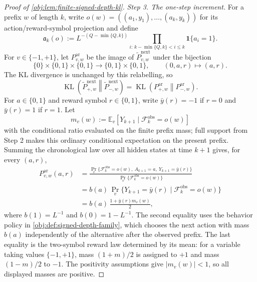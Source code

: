 \documentclass[11pt]{article}
\begin{document}
\begin{proof}[Proof of \cref{obj:lem:finite-signed-depth-kl}]
\emph{Step 3. The one-step increment.}
For a prefix \(w\) of length \(k\), write \(o(w)=((a_1,y_1),\ldots,(a_k,y_k))\) for its action/reward-symbol projection and define
\[
\mathfrak a_k(o)
:=
L^{-(Q-\min\{Q,k\})}
\prod_{i:\,k-\min\{Q,k\}<i\le k}\mathbf 1\{a_i=1\}.
\]
For \(v\in\{-1,+1\}\), let \(P_{v,w}^{\mathrm{ar}}\) be the image of \(\widetilde P_{v,w}^{\mathrm{next}}\) under the bijection
\[
\{0\}\times\{0,1\}\times\{0,1\}\longrightarrow \{0,1\}\times\{0,1\},
\qquad
(0,a,r)\longmapsto(a,r).
\]
The KL divergence is unchanged by this relabelling, so
\[
\operatorname{KL}\!\left(\widetilde P_{+,w}^{\mathrm{next}}\middle\|\widetilde P_{-,w}^{\mathrm{next}}\right)
=
\operatorname{KL}\!\left(P_{+,w}^{\mathrm{ar}}\middle\|P_{-,w}^{\mathrm{ar}}\right).
\]
For \(a\in\{0,1\}\) and reward symbol \(r\in\{0,1\}\), write \(\bar y(r)=-1\) if \(r=0\) and \(\bar y(r)=1\) if \(r=1\).  Let
\[
m_v(w):=
\mathbb E_v[Y_{k+1}\mid\mathcal F_k^{\mathrm{obs}}=o(w)]
\]
with the conditional ratio evaluated on the finite prefix mass; full support from Step 2 makes this ordinary conditional expectation on the present prefix.  Summing the chronological law over all hidden states at time \(k+1\) gives, for every \((a,r)\),
\[
\begin{aligned}
P_{v,w}^{\mathrm{ar}}(a,r)
&=
\frac{
\Pr_v\{\mathcal F_k^{\mathrm{obs}}=o(w),\ A_{k+1}=a,\ Y_{k+1}=\bar y(r)\}}
{\Pr_v\{\mathcal F_k^{\mathrm{obs}}=o(w)\}}  \\
&=
 b(a)\,\Pr_v\{Y_{k+1}=\bar y(r)\mid\mathcal F_k^{\mathrm{obs}}=o(w)\} \\
&=
 b(a)\,\frac{1+\bar y(r)m_v(w)}{2},
\end{aligned}
\]
where \(b(1)=L^{-1}\) and \(b(0)=1-L^{-1}\).  The second equality uses the behavior policy in \cref{obj:def:signed-depth-family}, which chooses the next action with mass \(b(a)\) independently of the alternative after the observed prefix.  The last equality is the two-symbol reward law determined by its mean: for a variable taking values \(\{-1,+1\}\), mass \((1+m)/2\) is assigned to \(+1\) and mass \((1-m)/2\) to \(-1\).  The positivity assumptions give \(|m_v(w)|<1\), so all displayed masses are positive.


\end{proof}
\end{document}
